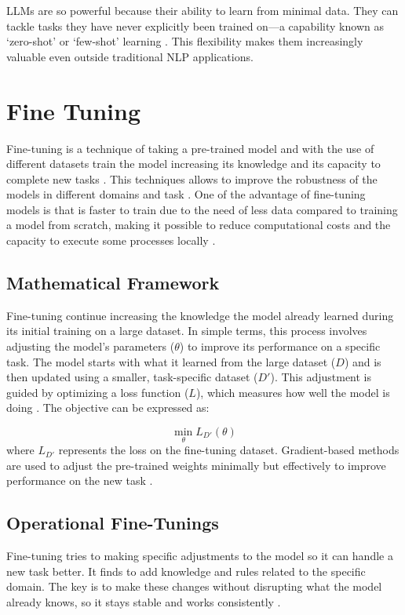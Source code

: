 LLMs are so powerful because their ability to learn from minimal data. They can tackle tasks they have never explicitly been trained on—a capability known as `zero-shot' or `few-shot' learning \citep{naveed2024comprehensive}. This flexibility makes them increasingly valuable even outside traditional NLP applications.

\section{Fine Tuning}
Fine-tuning is a technique of taking a pre-trained model and with the use of different datasets train the model increasing its knowledge and its capacity to complete new tasks \citep{Zhang2022Fine-Tuning}. This techniques allows to improve the robustness of the models in different domains and task \citep{Lalor2017Improving}. One of the advantage of fine-tuning models is that is faster to train due to the need of less data compared to training a model from scratch, making it possible to reduce computational costs and the capacity to execute some processes locally \citep{Xiao2023Offsite-Tuning:}.

\subsection{Mathematical Framework}
Fine-tuning continue increasing the knowledge the model already learned during its initial training on a large dataset. In simple terms, this process involves adjusting the model's parameters ($\theta$) to improve its performance on a specific task. The model starts with what it learned from the large dataset ($D$) and is then updated using a smaller, task-specific dataset ($D'$). This adjustment is guided by optimizing a loss function ($L$), which measures how well the model is doing \citep{Liu2023Improving}. The objective can be expressed as:

\[
\min_{\theta} L_{D'}(\theta)
\]
where $L_{D'}$ represents the loss on the fine-tuning dataset. Gradient-based methods are used to adjust the pre-trained weights minimally but effectively to improve performance on the new task \citep{Lalor2017Improving}.

\subsection{Operational Fine-Tunings}
Fine-tuning tries to making specific adjustments to the model so it can handle a new task better. It finds to add knowledge and rules related to the specific domain. The key is to make these changes without disrupting what the model already knows, so it stays stable and works consistently \citep{Catani2020A}.

